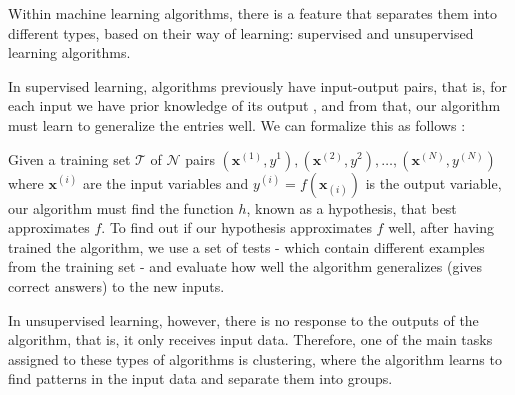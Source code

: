 
Within machine learning algorithms, there is a feature that separates them into different types, based on their way of learning: supervised and unsupervised learning algorithms.

In supervised learning, algorithms previously have input-output pairs, that is, for each input we have prior knowledge of its output \cite{russell2016}, and from that, our algorithm must learn to generalize the entries well. We can formalize this as follows \cite{russell2016}:

Given a training set $\mathcal{T}$ of $\mathcal{N}$ pairs $(\mathbf{x}^{(1)},y^1),(\mathbf{x}^{(2)},y^2),\dots,(\mathbf{x}^{(N)},y^{(N)})$ where $\mathbf{x}^{(i)}$ are the input variables and $y^{(i)}=f(\mathbf{x}_{(i)})$ is the output variable, our algorithm must find the function $h$, known as a hypothesis, that best approximates $f$. To find out if our hypothesis approximates $f$ well, after having trained the algorithm, we use a set of tests - which contain different examples from the training set - and evaluate how well the algorithm generalizes (gives correct answers) to the new inputs.

In unsupervised learning, however, there is no response to the outputs of the algorithm, that is, it only receives input data. Therefore, one of the main tasks assigned to these types of algorithms is clustering, where the algorithm learns to find patterns in the input data and separate them into groups.





%
